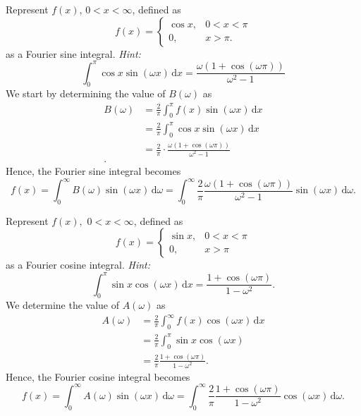 
Represent $f(x)$, $0 < x < \infty$, defined as
\[ 
f(x) = \begin{cases}
\cos x, & 0 < x < \pi\\
0, & x > \pi
.\end{cases}
\]
as a Fourier sine integral.
\textit{Hint:}
\[ 
\int_{0}^{\pi} \cos x \sin \left( \omega x \right) \, \mathrm{d}x = \frac{\omega \left( 1 + \cos \left( \omega \pi \right) \right)}{\omega^2 - 1}
\]
\hr
We start by determining the value of $B(\omega)$ as
\begin{align*}
  B(\omega) &= \frac{2}{\pi} \int_{0}^{\pi} f(x) \sin (\omega x) \, \mathrm{d}x  \\
       &= \frac{2}{\pi} \int_{0}^{\pi} \cos x \sin \left( \omega x \right) \, \mathrm{d}x \\
       &= \frac{2}{\pi} \cdot \frac{\omega \left( 1 + \cos \left( \omega \pi \right) \right)}{\omega^2 - 1} \\
.\end{align*}
Hence, the Fourier sine integral becomes
\[ 
f(x) = \int_{0}^{\infty} B(\omega) \sin \left( \omega x \right) \, \mathrm{d}\omega = \int_{0}^{\infty} \frac{2}{\pi} \frac{\omega \left( 1 + \cos (\omega \pi) \right)}{\omega^2 - 1} \sin (\omega x) \, \mathrm{d}\omega
.\]

Represent $f(x),$ $0 < x < \infty$, defined as
\[ 
f(x) = \begin{cases}
\sin x, & 0 < x < \pi \\
0, & x > \pi
\end{cases}
\]
as a Fourier cosine integral.
\textit{Hint:}
\[ 
\int_{0}^{\pi} \sin x \cos \left( \omega x \right) \, \mathrm{d}x = \frac{1 + \cos \left( \omega \pi \right)}{1 - \omega^2}
.\]
\hr
We determine the value of $A(\omega)$ as
\begin{align*}
  A \left( \omega \right) &= \frac{2}{\pi} \int_{0}^{\infty} f(x) \cos (\omega x) \, \mathrm{d}x  \\
  &= \frac{2}{\pi} \int_{0}^{\pi} \sin x \cos (\omega x) \\
  &= \frac{2}{\pi} \frac{1 + \cos (\omega \pi)}{1 - \omega^2}
.\end{align*}
Hence, the Fourier cosine integral becomes
\[ 
f(x) = \int_{0}^{\infty} A(\omega) \sin(\omega x) \, \mathrm{d}\omega = \int_{0}^{\infty} \frac{2}{\pi} \frac{1 + \cos (\omega \pi)}{1 - \omega^2} \cos (\omega x) \, \mathrm{d}\omega
.\]



